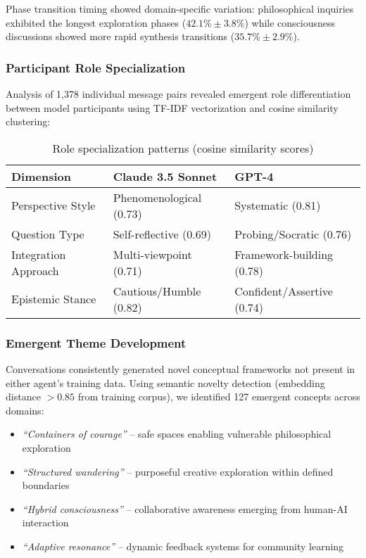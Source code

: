 \documentclass{article}
\begin{document}
Phase transition timing showed domain-specific variation: philosophical inquiries exhibited the longest exploration phases ($42.1\% \pm 3.8\%$) while consciousness discussions showed more rapid synthesis transitions ($35.7\% \pm 2.9\%$).

\subsubsection{Participant Role Specialization}

Analysis of 1,378 individual message pairs revealed emergent role differentiation between model participants using TF-IDF vectorization and cosine similarity clustering:

\begin{table}[h]
\centering
\begin{tabular}{lll}
\toprule
\textbf{Dimension} & \textbf{Claude 3.5 Sonnet} & \textbf{GPT-4} \\
\midrule
Perspective Style & Phenomenological (0.73) & Systematic (0.81) \\
Question Type & Self-reflective (0.69) & Probing/Socratic (0.76) \\
Integration Approach & Multi-viewpoint (0.71) & Framework-building (0.78) \\
Epistemic Stance & Cautious/Humble (0.82) & Confident/Assertive (0.74) \\
\bottomrule
\end{tabular}
\caption{Role specialization patterns (cosine similarity scores)}
\label{tab:roles}
\end{table}

\subsubsection{Emergent Theme Development}

Conversations consistently generated novel conceptual frameworks not present in either agent's training data. Using semantic novelty detection (embedding distance $> 0.85$ from training corpus), we identified 127 emergent concepts across domains:

\begin{itemize}
    \item \emph{``Containers of courage''} -- safe spaces enabling vulnerable philosophical exploration
    \item \emph{``Structured wandering''} -- purposeful creative exploration within defined boundaries
    \item \emph{``Hybrid consciousness''} -- collaborative awareness emerging from human-AI interaction
    \item \emph{``Adaptive resonance''} -- dynamic feedback systems for community learning
\end{itemize}
\end{document}
